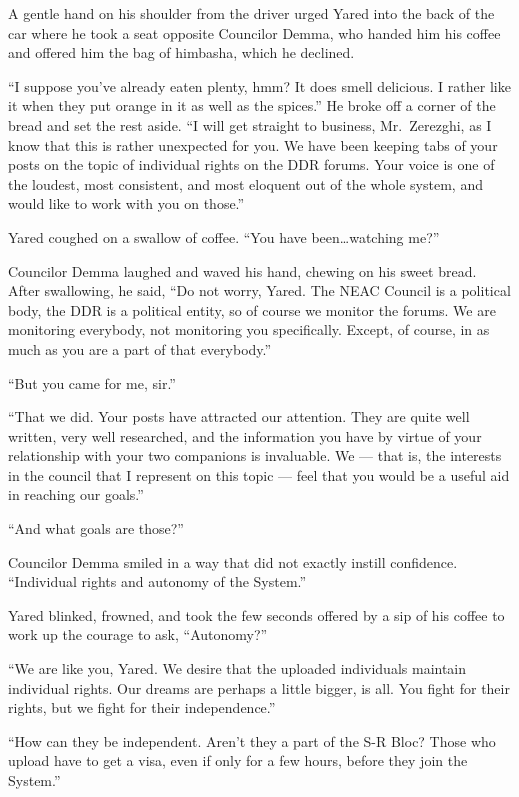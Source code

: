 A gentle hand on his shoulder from the driver urged Yared into the back of the car where he took a seat opposite Councilor Demma, who handed him his coffee and offered him the bag of himbasha, which he declined.

``I suppose you've already eaten plenty, hmm? It does smell delicious. I rather like it when they put orange in it as well as the spices.'' He broke off a corner of the bread and set the rest aside. ``I will get straight to business, Mr.~Zerezghi, as I know that this is rather unexpected for you. We have been keeping tabs of your posts on the topic of individual rights on the DDR forums. Your voice is one of the loudest, most consistent, and most eloquent out of the whole system, and would like to work with you on those.''

Yared coughed on a swallow of coffee. ``You have been\ldots watching me?''

Councilor Demma laughed and waved his hand, chewing on his sweet bread. After swallowing, he said, ``Do not worry, Yared. The NEAC Council is a political body, the DDR is a political entity, so of course we monitor the forums. We are monitoring everybody, not monitoring you specifically. Except, of course, in as much as you are a part of that everybody.''

``But you came for me, sir.''

``That we did. Your posts have attracted our attention. They are quite well written, very well researched, and the information you have by virtue of your relationship with your two companions is invaluable. We — that is, the interests in the council that I represent on this topic — feel that you would be a useful aid in reaching our goals.''

``And what goals are those?''

Councilor Demma smiled in a way that did not exactly instill confidence. ``Individual rights and autonomy of the System.''

Yared blinked, frowned, and took the few seconds offered by a sip of his coffee to work up the courage to ask, ``Autonomy?''

``We are like you, Yared. We desire that the uploaded individuals maintain individual rights. Our dreams are perhaps a little bigger, is all. You fight for their rights, but we fight for their independence.''

``How can they be independent. Aren't they a part of the S-R Bloc? Those who upload have to get a visa, even if only for a few hours, before they join the System.''

